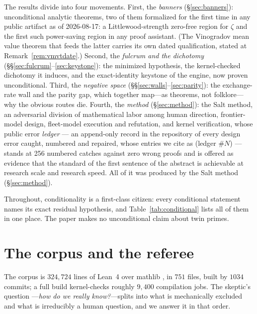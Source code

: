 \documentclass{CUP-JNL-FMP}
\theoremstyle{remark}
\begin{document}
The results divide into four movements. First, the \emph{banners}
(\S\ref{sec:banners}): unconditional analytic theorems, two of them
formalized for the first time in any public artifact as of 2026-08-17: a
Littlewood-strength zero-free region for $\zeta$ and the first such
power-saving region in any proof assistant. (The Vinogradov mean value
theorem that feeds the latter carries its own dated qualification, stated
at Remark~\ref{rem:vmvtdate}.) Second, the
\emph{fulcrum and the dichotomy} (\S\S\ref{sec:fulcrum}--\ref{sec:keystone}):
the minimized hypothesis, the kernel-checked dichotomy it induces, and the
exact-identity keystone of the engine, now proven unconditional. Third,
the \emph{negative space}
(\S\S\ref{sec:walls}--\ref{sec:parity}): the exchange-rate wall and the
parity gap, which together map---as theorems, not folklore---why the
obvious routes die. Fourth, the \emph{method} (\S\ref{sec:method}): the
Salt method, an adversarial division of mathematical labor among human
direction, frontier-model design, fleet-model execution and refutation,
and kernel verification, whose public error \emph{ledger} --- an
append-only record in the repository of every design error caught,
numbered and repaired, whose entries we cite as (ledger \#$N$) --- stands
at 256 numbered catches against zero wrong proofs and is offered as evidence that the standard of the first
sentence of the abstract is achievable at research scale and research
speed. All of it was produced by the Salt method (\S\ref{sec:method}).

Throughout, conditionality is a first-class citizen: every conditional
statement names its exact residual hypothesis, and
Table~\ref{tab:conditional} lists all of them in one place. The paper
makes no unconditional claim about twin primes.

\section{The corpus and the referee}\label{sec:trust}

The corpus is $324{,}724$ lines of Lean~4 over \textsf{mathlib}
\cite{mathlib}, in $751$ files, built by $1034$ commits; a full build
kernel-checks roughly $9{,}400$ compilation jobs. The skeptic's question
---\emph{how do we really know?}---splits into what is mechanically
excluded and what is irreducibly a human question, and we answer it in
that order.
\end{document}
